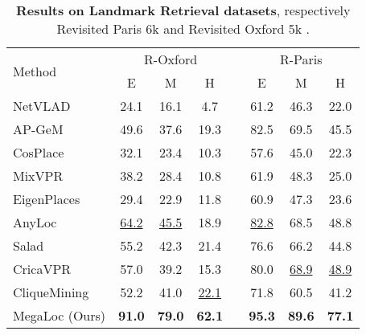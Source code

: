 \begin{table}
\begin{center}
\begin{adjustbox}{width=0.9\linewidth}
\centering
\begin{tabular}{lccccccc}
\toprule
\multicolumn{1}{l}{\multirow{2}{*}{Method}} & \multicolumn{3}{c}{R-Oxford} & & \multicolumn{3}{c}{R-Paris}\\
\cline{2-4} \cline{6-8}
& E & M & H & & E & M & H\\
\hline
NetVLAD        & 24.1 & 16.1 &  4.7 && 61.2 & 46.3 & 22.0 \\
AP-GeM         & 49.6 & 37.6 & 19.3 && 82.5 & 69.5 & 45.5 \\
CosPlace       & 32.1 & 23.4 & 10.3 && 57.6 & 45.0 & 22.3 \\
MixVPR         & 38.2 & 28.4 & 10.8 && 61.9 & 48.3 & 25.0 \\
EigenPlaces    & 29.4 & 22.9 & 11.8 && 60.9 & 47.3 & 23.6 \\
AnyLoc  &\underline{64.2}&\underline{45.5}& 18.9 &&\underline{82.8}& 68.5 & 48.8 \\
Salad          & 55.2 & 42.3 & 21.4 && 76.6 & 66.2 & 44.8 \\
CricaVPR       & 57.0 & 39.2 & 15.3 && 80.0 & \underline{68.9} & \underline{48.9} \\
CliqueMining   & 52.2 & 41.0 &\underline{22.1}&& 71.8 & 60.5 & 41.2 \\
MegaLoc (Ours)&\textbf{91.0}&\textbf{79.0}&\textbf{62.1}&&\textbf{95.3}&\textbf{89.6}&\textbf{77.1}\\
\bottomrule
\end{tabular}
\end{adjustbox}
\end{center}
\caption{\textbf{Results on Landmark Retrieval datasets}, respectively Revisited Paris 6k \cite{Radenovic_CVPR_2018_roxford_rparis, Philbin_2008_paris6k} and Revisited Oxford 5k \cite{Radenovic_CVPR_2018_roxford_rparis, Philbin_2007_oxford5k}.}
\label{tab:landmark_retrieval}
\end{table}

